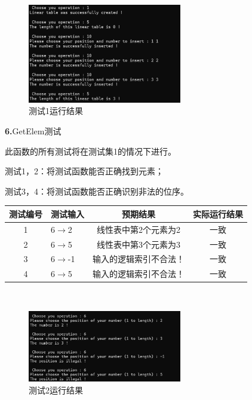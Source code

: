 \documentclass[supercite]{Experimental_Report}
\theoremstyle{definition}
\begin{document}
 \begin{figure}[H]
 	\centering
 	\includegraphics[width=0.6\textwidth]{images/线性表测试5.png}
 	\caption{测试1运行结果}
 	\label{txlab}
 \end{figure}


\noindent\textbf{ 6.}GetElem测试

此函数的所有测试将在测试集1的情况下进行。

测试1，2：将测试函数能否正确找到元素；

测试3，4：将测试函数能否正确识别非法的位序。

\vspace{0.5em}

\begin{tabular}{|c|l|c|c|}
	\hline
	测试编号 & 测试输入 & 预期结果 & 实际运行结果 \\
	\hline
	1 & 6$\rightarrow$2 & 线性表中第2个元素为2 & 一致 \\
	\hline
	2 & 6$\rightarrow$5 & 线性表中第3个元素为3 & 一致 \\
	\hline
	3 & 6$\rightarrow$-1 & 输入的逻辑索引不合法！ & 一致 \\
	\hline
	4 & 6$\rightarrow$5 & 输入的逻辑索引不合法！ & 一致 \\
	\hline
\end{tabular}

~\

 \begin{figure}[H]
 	\centering
 	\includegraphics[width=0.6\textwidth]{images/线性表测试6.png}
 	\caption{测试2运行结果}
 	\label{txlab}
 \end{figure}
\end{document}
